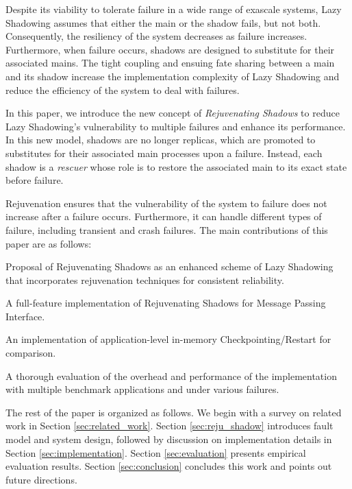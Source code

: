 Despite its viability to tolerate failure in a wide range of exascale systems, Lazy Shadowing assumes that either the main or the shadow fails, but not both. Consequently, the resiliency of the system decreases as failure increases. Furthermore, when failure occurs, shadows are designed to substitute for their associated mains. The tight coupling and ensuing fate sharing between a main and its shadow increase the implementation complexity of Lazy Shadowing and reduce the efficiency of the system to deal with failures. 

In this paper, we introduce the new concept of {\it Rejuvenating Shadows} to reduce Lazy Shadowing's vulnerability to multiple failures and enhance its performance. In this new model, shadows are no longer replicas, which are promoted to substitutes for their associated main processes upon a failure. Instead, each shadow is a {\it rescuer} whose role is to restore the associated main to its exact state before failure. 

Rejuvenation ensures that the vulnerability of the system to failure does not increase after a failure occurs. Furthermore, it can handle different types of failure, including transient and crash failures. The main contributions of this paper are as follows:


\begin{itemize}
{
   \item Proposal of Rejuvenating Shadows as an enhanced scheme of Lazy Shadowing that incorporates rejuvenation techniques for consistent reliability.%
   \item A full-feature implementation of Rejuvenating Shadows for Message Passing Interface.
   \item An implementation of application-level in-memory Checkpointing/Restart for comparison.
   \item A thorough evaluation of the overhead and performance of the implementation with multiple benchmark applications and under various failures.
}
\end{itemize}

The rest of the paper is organized as follows. We begin with a survey on related work in Section 
\ref{sec:related_work}. Section \ref{sec:reju_shadow} introduces fault model and system design, followed by discussion on implementation details in Section \ref{sec:implementation}.
Section \ref{sec:evaluation} presents empirical evaluation results. Section \ref{sec:conclusion} concludes this work and points out future directions.



